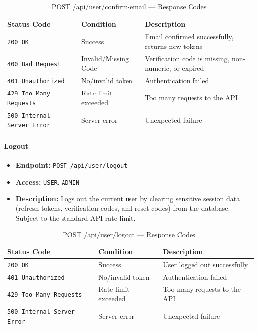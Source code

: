 \begin{table}[H]
\centering
\renewcommand{\arraystretch}{1.3}
\begin{tabularx}{\textwidth}{|l|l|X|}
\hline
\textbf{Status Code} & \textbf{Condition} & \textbf{Description} \\
\hline
\texttt{200 OK}           & Success              & Email confirmed successfully, returns new tokens \\
\hline
\texttt{400 Bad Request}  & Invalid/Missing Code & Verification code is missing, non-numeric, or expired \\
\hline
\texttt{401 Unauthorized} & No/invalid token     & Authentication failed \\
\hline
\texttt{429 Too Many Requests} & Rate limit exceeded & Too many requests to the API \\
\hline
\texttt{500 Internal Server Error} & Server error & Unexpected failure \\
\hline
\end{tabularx}
\caption{POST /api/user/confirm-email — Response Codes}
\label{tab:confirm-email-responses}
\end{table}
\FloatBarrier

\paragraph{Logout}
\label{subsubsec:logout}

\begin{itemize}
  \item \textbf{Endpoint:} \texttt{POST /api/user/logout}
  \item \textbf{Access:} \texttt{USER}, \texttt{ADMIN}
  \item \textbf{Description:} Logs out the current user by clearing sensitive session data (refresh tokens, verification codes, and reset codes) from the database. Subject to the standard API rate limit.
\end{itemize}

\begin{table}[H]
\centering
\renewcommand{\arraystretch}{1.3}
\begin{tabularx}{\textwidth}{|l|l|X|}
\hline
\textbf{Status Code} & \textbf{Condition} & \textbf{Description} \\
\hline
\texttt{200 OK}           & Success              & User logged out successfully \\
\hline
\texttt{401 Unauthorized} & No/invalid token     & Authentication failed \\
\hline
\texttt{429 Too Many Requests} & Rate limit exceeded & Too many requests to the API \\
\hline
\texttt{500 Internal Server Error} & Server error & Unexpected failure \\
\hline
\end{tabularx}
\caption{POST /api/user/logout — Response Codes}
\label{tab:logout-responses}
\end{table}
\FloatBarrier
